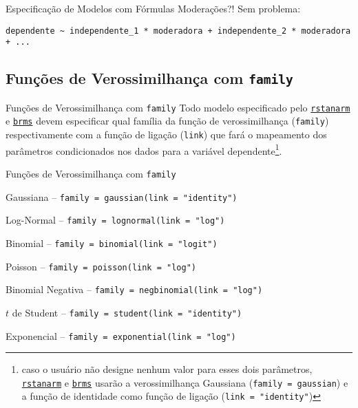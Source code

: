 \begin{frame}[fragile]{Especificação de Modelos com Fórmulas}
    Moderações?! Sem problema:
    \vfill
    \begin{lstlisting}[basicstyle=\footnotesize]
dependente ~ independente_1 * moderadora + independente_2 * moderadora + ...
    \end{lstlisting}
\end{frame}

\subsection{Funções de Verossimilhança com \texttt{family}}
\begin{frame}{Funções de Verossimilhança com \texttt{family}}
    Todo modelo especificado pelo \href{http://mc-stan.org/rstanarm/}{\texttt{rstanarm}} e
    \href{https://paul-buerkner.github.io/brms/}{\texttt{brms}} devem especificar qual
    família da função de verossimilhança (\texttt{family}) respectivamente com a
    função de ligação (\texttt{link}) que fará o mapeamento dos parâmetros
    condicionados nos dados para a variável
    dependente\footnote{caso o usuário não designe nenhum valor para esses dois parâmetros, \href{http://mc-stan.org/rstanarm/}{\texttt{rstanarm}} e \href{https://paul-buerkner.github.io/brms/}{\texttt{brms}} usarão a verossimilhança Gaussiana (\texttt{family = gaussian}) e a função de identidade como função de ligação (\texttt{link = "identity"})}.
\end{frame}

\begin{frame}{Funções de Verossimilhança com \texttt{family}}
    \begin{vfilleditems}
        \item Gaussiana -- \texttt{family = gaussian(link = "identity")}
        \item Log-Normal -- \texttt{family = lognormal(link = "log")}
        \item Binomial -- \texttt{family = binomial(link = "logit")}
        \item Poisson -- \texttt{family = poisson(link = "log")}
        \item Binomial Negativa -- \texttt{family = negbinomial(link = "log")}
        \item $t$ de Student -- \texttt{family = student(link = "identity")}
        \item Exponencial -- \texttt{family = exponential(link = "log")}
    \end{vfilleditems}
\end{frame}

